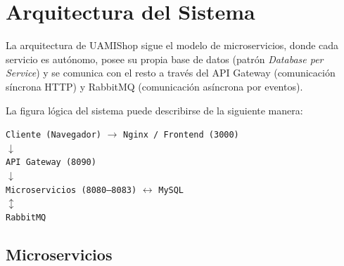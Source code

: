 \documentclass[12pt,a4paper]{article}
\begin{document}
\section{Arquitectura del Sistema}

La arquitectura de UAMIShop sigue el modelo de microservicios, donde cada servicio es
aut\'onomo, posee su propia base de datos (patr\'on \textit{Database per Service}) y se
comunica con el resto a trav\'es del API Gateway (comunicaci\'on s\'incrona HTTP) y
RabbitMQ (comunicaci\'on as\'incrona por eventos).

La figura l\'ogica del sistema puede describirse de la siguiente manera:

\begin{center}
  \texttt{Cliente (Navegador)} $\rightarrow$ \texttt{Nginx / Frontend (3000)} \\
  $\downarrow$ \\
  \texttt{API Gateway (8090)} \\
  $\downarrow$ \\
  \texttt{Microservicios (8080--8083)}
  $\leftrightarrow$ \texttt{MySQL} \\
  \hspace{3.5cm} $\updownarrow$ \\
  \hspace{3.5cm} \texttt{RabbitMQ}
\end{center}

\subsection{Microservicios}
\end{document}
